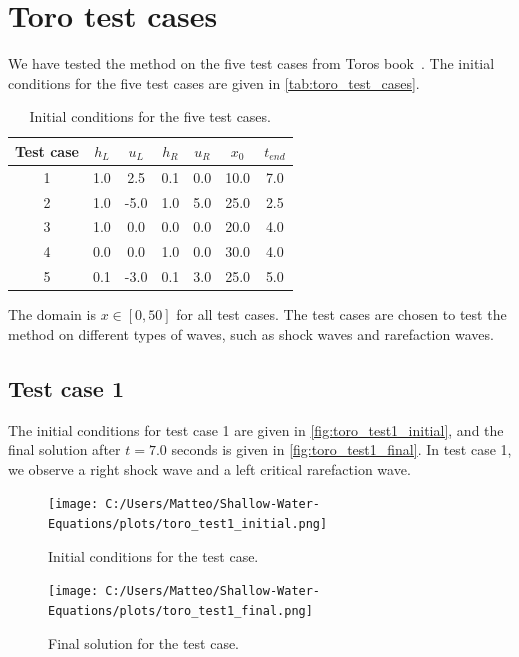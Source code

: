 \section{Toro test cases}
We have tested the method on the five test cases from Toros book~\cite{Toro2001-Shock}.
The initial conditions for the five test cases are given in \autoref{tab:toro_test_cases}.

\begin{table}[H]
    \centering
    \begin{tabular}{c|c|c|c|c|c|c}
        \hline
        \textbf{Test case} & \textbf{$h_L$} & \textbf{$u_L$} & \textbf{$h_R$} & \textbf{$u_R$} & \textbf{$x_0$} & \textbf{$t_{end}$} \\
        \hline\hline
        1 & 1.0 & 2.5 & 0.1 & 0.0 & 10.0 & 7.0 \\
        2 & 1.0 & -5.0 & 1.0 & 5.0 & 25.0 & 2.5 \\
        3 & 1.0 & 0.0 & 0.0 & 0.0 & 20.0 & 4.0 \\
        4 & 0.0 & 0.0 & 1.0 & 0.0 & 30.0 & 4.0 \\
        5 & 0.1 & -3.0 & 0.1 & 3.0 & 25.0 & 5.0 \\
        \hline
    \end{tabular}
    \caption{Initial conditions for the five test cases.}
    \label{tab:toro_test_cases}
\end{table}
The domain is $x \in [0,50]$ for all test cases.
The test cases are chosen to test the method on different types of waves, such as shock waves and rarefaction waves.

\subsection*{Test case 1}
The initial conditions for test case 1 are given in \autoref{fig:toro_test1_initial}, and the final solution after $t=7.0$ seconds is given in \autoref{fig:toro_test1_final}.
In test case 1, we observe a right shock wave and a left critical rarefaction wave.
\begin{figure}[H]
    \centering
    \texttt{[image: C:/Users/Matteo/Shallow-Water-Equations/plots/toro\_test1\_initial.png]}
    \caption{Initial conditions for the test case.}\label{fig:toro_test1_initial}
\end{figure}


\begin{figure}[H]
    \centering
    \texttt{[image: C:/Users/Matteo/Shallow-Water-Equations/plots/toro\_test1\_final.png]}
    \caption{Final solution for the test case.}\label{fig:toro_test1_final}
\end{figure}

